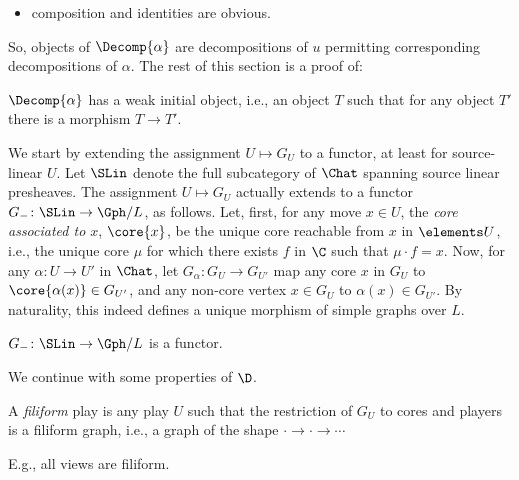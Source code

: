 \documentclass{LMCS}
\theoremstyle{plain}\newtheorem{satz}[thm]{Satz}
\begin{document}
\begin{itemize}
\begin{center}
{    |(B)| B \& |(M)| \& |(Z')| Z' \&  \\
    \& |(Z)| Z \& \& |(R)| \\
    |(C)| C \& \& |(Y)| Y, }{(A) edge[labelu={h}] (X) edge[pro,labell={w}] (B) (X) edge[pro,bend left=70,labelr={u}] (Y) (B) edge[pro,labell={v}] (C) (C) edge[labeld={k}] (Y) (B) edge[labelu={}] (Z) (X) edge[pro,labell={}] (Z') (Z') edge[pro,labell={}] (Y) (B) edge[labelu={}] (Z') (Z') edge[pro,labelbr={f}] (Z) }
\end{center} 
commutes, i.e., $\gamma \rond (\alpha_1 \vrond \delta) = \alpha'_1$,
$\beta \rond \alpha_2 = \delta \vrond \alpha'_2$, and $\alpha'_3 \rond
(\gamma \vrond u'_2) \rond (u_1 \vrond \beta) = \alpha_3$, and $\beta$
and $\gamma$ are isomorphisms;
\item composition and identities are obvious.
\end{itemize}
So, objects of $\Decomp{\alpha}$ are decompositions of $u$ permitting corresponding decompositions of $\alpha$.
The rest of this section is a proof of:
\begin{lem}\label{lem:decomp}
  $\Decomp{\alpha}$ has a weak initial object, i.e., an object $T$
  such that for any object $T'$ there is a morphism $T \to T'$.
\end{lem}

We start by extending the assignment $U \mapsto G_U$ to a functor, at
least for source-linear $U$.  Let $\SLin$ denote the full subcategory
of $\Chat$ spanning source linear presheaves.  The assignment $U
\mapsto G_U$ actually extends to a functor $G_{-} \colon \SLin \to
\Gph/L$, as follows.  Let, first, for any move $x \in U$, the
\emph{core associated to $x$}, $\core{x}$, be the unique core
reachable from $x$ in $\elements U$, i.e., the unique core $\mu$ for which
there exists $f$ in $\C$ such that $\mu \cdot f = x$.  Now, for any
$\alpha \colon U \to U'$ in $\Chat$, let $G_\alpha \colon G_U \to
G_{U'}$ map any core $x$ in $G_U$ to $\core{\alpha (x)} \in G_{U'}$,
and any non-core vertex $x \in G_U$ to $\alpha (x) \in G_{U'}$. By
naturality, this indeed defines a unique morphism of simple graphs
over $L$.
 \begin{prop} \label{prop:Gfunctor}
   $G_{-} \colon \SLin \to \Gph / L$ is a functor. 
 \end{prop} 


We continue with some properties of $\D$.


\begin{defi}
  A \emph{filiform} play is any play $U$ such that the restriction of
  $G_U$ to cores and players is a filiform graph, i.e., a graph of the
  shape $\cdot \to \cdot \to \cdots$
\end{defi}
E.g., all views are filiform.
\end{document}
